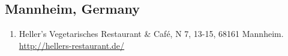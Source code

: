\subsection{Mannheim, Germany}
\begin{enumerate}
 \item Heller's Vegetarisches Restaurant \& Café, N 7, 13-15, 68161 Mannheim. \href{http://hellers-restaurant.de/}{http://hellers-restaurant.de/}
\end{enumerate}
